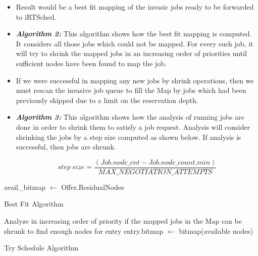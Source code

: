 \begin{itemize}
\item Result would be a best fit mapping of the invasic jobs ready to be forwarded to iRTSched.
\item \textbf{\textit{Algorithm 2:}} This algorithm shows how the best fit mapping is computed. It considers all those jobs which could not be mapped. For every such job, it will try to shrink the mapped jobs in an increasing order of priorities until sufficient nodes have been found to map the job. 
\item If we were successful in mapping any new jobs by shrink operations, then we must rescan the invasive job queue to fill the Map by jobs which had been previously skipped due to a limit on the reservation depth.
\item \textbf{\textit{Algorithm 3:}} This algorithm shows how the analysis of running jobs are done in order to shrink them to satisfy a job request. Analysis will consider shrinking the jobs by a step size computed as shown below. If analysis is successful, then jobs are shrunk.
\vspace{-0.30in}
\begin{center}
\boldmath\begin{equation*}
step\ size = \frac{(Job.node\_cnt - Job.node\_count.min)}{MAX\_NEGOTIATION\_ATTEMPTS}
\end{equation*}
\end{center}
\end{itemize}
\setcounter{AlgoLine}{0}
\begin{algorithm}[!htbp]
 \DontPrintSemicolon
 avail\_bitmap $\leftarrow$ Offer.ResidualNodes\;
 \caption{Best Fit Algorithm}
\end{algorithm}
\setcounter{AlgoLine}{0}
\begin{algorithm}[!htbp]
 \DontPrintSemicolon
 Analyze in increasing order of priority if the mapped jobs in the Map can be shrunk to find enough nodes for entry\;
 entry.bitmap $\leftarrow$ bitmap(available nodes)\;
 \caption{Try Schedule Algorithm}
\end{algorithm}
\setcounter{AlgoLine}{0}
